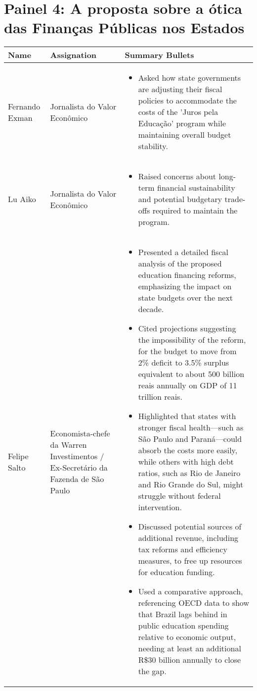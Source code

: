 \documentclass[a4paper,10pt]{article}
\begin{document}
\section*{Painel 4: A proposta sobre a ótica das Finanças Públicas nos Estados}

\begin{table}[htbp!]
\centering
\renewcommand{\arraystretch}{1.2}
\begin{tabular}{|p{1.2in}|p{1.6in}|p{4.2in}|}
\hline
Name & Assignation & Summary Bullets \\
\hline
Fernando Exman & Jornalista do Valor Econômico & 
\begin{itemize}
\item Asked how state governments are adjusting their fiscal policies to accommodate the costs of the 'Juros pela Educação' program while maintaining overall budget stability.
\end{itemize}\\
\hline
Lu Aiko & Jornalista do Valor Econômico & \begin{itemize}
\item Raised concerns about long-term financial sustainability and potential budgetary trade-offs required to maintain the program.
\end{itemize}\\
\hline
Felipe Salto & Economista-chefe da Warren Investimentos / Ex-Secretário da Fazenda de São Paulo & \begin{itemize}
\item Presented a detailed fiscal analysis of the proposed education financing reforms, emphasizing the impact on state budgets over the next decade.
\item Cited projections  suggesting the impossibility of the reform, for the budget to move from 2\% deficit to 3.5\% surplus equivalent to about 500 billion reais annually on GDP of 11 trillion reais. 
\item Highlighted that states with stronger fiscal health—such as São Paulo and Paraná—could absorb the costs more easily, while others with high debt ratios, such as Rio de Janeiro and Rio Grande do Sul, might struggle without federal intervention.
\item Discussed potential sources of additional revenue, including tax reforms and efficiency measures, to free up resources for education funding.
\item Used a comparative approach, referencing OECD data to show that Brazil lags behind in public education spending relative to economic output, needing at least an additional R\$30 billion annually to close the gap.

\end{itemize}
\end{tabular}
\end{table}
\end{document}
